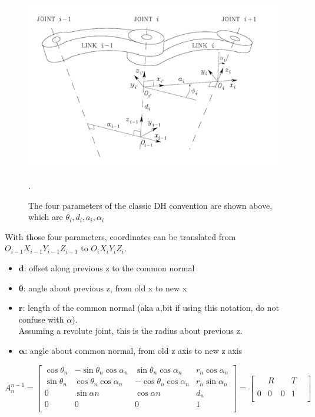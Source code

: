\documentclass{UoNMCHA}
\numberwithin{equation}{section}
\begin{document}
	\begin{figure}[H]
		\begin{center}
			\includegraphics[width=.8\linewidth]{figs/Picture2}
			\caption{The four parameters of the classic $\mathrm{DH}$ convention are shown above, which are $\theta_{i}, d_{i}, a_{i}, \alpha_{i}$ \cite{renton_mcha4000}}.
			\label{figs/Picture2}
		\end{center}
	\end{figure}
	
	With those four parameters, coordinates can be translated from $O_{i-1}X_{i-1}Y_{i-1}Z_{i-1}$ to $O_iX_iY_iZ_i$.
	\begin{itemize}[label={}]
	\item $\mathbf{d}$: offset along previous z to the common normal
	\item $\mathbf{\theta}$: angle about previous z, from old x to new x
	\item $\mathbf{r}$: length of the common normal (aka a,bit if using this notation, do not confuse with $\alpha$).\\ \hspace*{3 mm} Assuming a revolute joint, this is the radius about previous z.
	\item $\mathbf{\alpha}$: angle about common normal, from old z axis to new z axis\\
	\end{itemize}


	\begin{equation} \label{eq/denavit}
	A_{n}^{n-1} = 
	\begin{bmatrix}
	\cos{\theta_{n}} & -\sin{\theta_{n}} \cos{\alpha_{n}} & \sin{\theta_{n}} \cos{\alpha_{n}} & r_{n} \cos{\alpha_{n}} \\ 
	\sin{\theta_{n}} & \cos{\theta_{n}} \cos{\alpha_{n}} & -\cos{\theta_{n}} \cos{\alpha_{n}} & r_{n} \sin	{\alpha_{n}} \\
	0 & \sin{\alpha{n}} & \cos{\alpha{n}} & d_n \\
	0 & 0 & 0 & 1 \\ 
	\end{bmatrix} =
	\begin{bmatrix}
	& R &  & T \\
	& & & & \\	
	0 & 0 & 0 & 1 \\
	\end{bmatrix}
	\end{equation}
	\\
	
\end{document}
